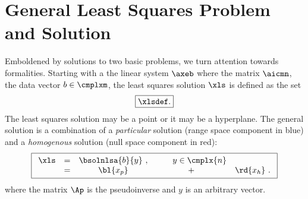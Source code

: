 \section{\label{sec:lsp}General Least Squares Problem and Solution}  %
Emboldened by solutions to two basic problems, we turn attention towards formalities. Starting with a the linear system $\axeb$ where the matrix $\aicmn$, the data vector $b\in\cmplxm$, the least squares solution $\xls$ is defined as the set
  \begin{equation}   %
  \boxed{
    \xlsdef .
    \label{eq:xlsdef}
	}
  \end{equation}
The least squares solution may be a point or it may be a hyperplane. The general solution is a combination of a \emph{particular} solution (range space component in blue) and a \emph{homogenous} solution (null space component in red):
  \begin{equation}   %
  \boxed{
   \begin{array}{cccccl}
     \xls 
       & = & \bsolnlsa{b}{y}\ , & \qquad y \in \cmplx{n} \\
       & = & \bl{x_{p}} & + & \rd{x_{h}}\ .
    \label{eq:general soln}
   \end{array}
  }
  \end{equation}
where the matrix $\Ap$ is the pseudoinverse and $y$ is an arbitrary vector.


\endinput